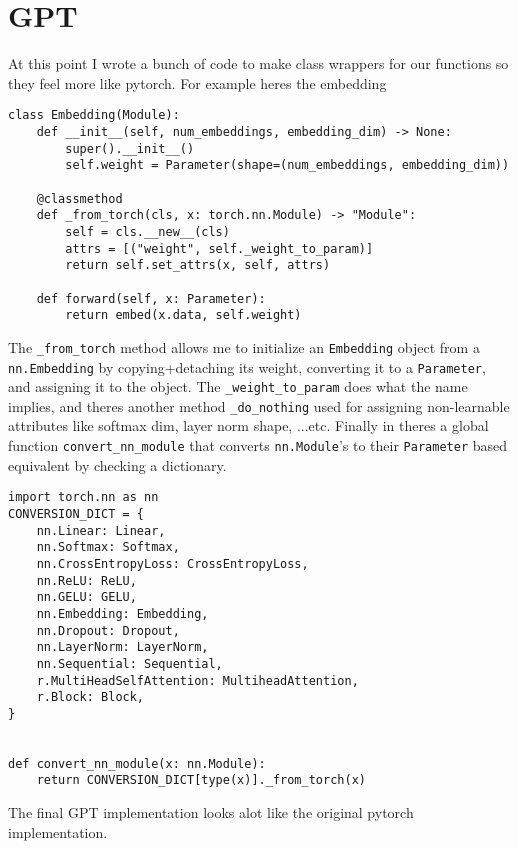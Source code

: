 \documentclass[11pt]{article}
\begin{document}
\section{GPT}
At this point I wrote a bunch of code to make class wrappers for our functions so they feel more like
pytorch. For example heres the embedding
\begin{verbatim}
class Embedding(Module):
    def __init__(self, num_embeddings, embedding_dim) -> None:
        super().__init__()
        self.weight = Parameter(shape=(num_embeddings, embedding_dim))

    @classmethod
    def _from_torch(cls, x: torch.nn.Module) -> "Module":
        self = cls.__new__(cls)
        attrs = [("weight", self._weight_to_param)]
        return self.set_attrs(x, self, attrs)

    def forward(self, x: Parameter):
        return embed(x.data, self.weight)
\end{verbatim}
The \texttt{\_from\_torch} method allows me to initialize an \texttt{Embedding} object from a \texttt{nn.Embedding}
by copying+detaching its weight, converting it to a \texttt{Parameter}, and assigning it to the object. The 
\texttt{\_weight\_to\_param} does what the name implies, and theres another method \texttt{\_do\_nothing} used for
assigning non-learnable attributes like softmax dim, layer norm shape, ...etc. Finally in theres a global function
\texttt{convert\_nn\_module} that converts \texttt{nn.Module}'s to their \texttt{Parameter} based equivalent by checking a 
dictionary. 
\begin{verbatim}
import torch.nn as nn
CONVERSION_DICT = {
    nn.Linear: Linear,
    nn.Softmax: Softmax,
    nn.CrossEntropyLoss: CrossEntropyLoss,
    nn.ReLU: ReLU,
    nn.GELU: GELU,
    nn.Embedding: Embedding,
    nn.Dropout: Dropout,
    nn.LayerNorm: LayerNorm,
    nn.Sequential: Sequential,
    r.MultiHeadSelfAttention: MultiheadAttention,
    r.Block: Block,
}


def convert_nn_module(x: nn.Module):
    return CONVERSION_DICT[type(x)]._from_torch(x)
\end{verbatim}
\par The final GPT implementation
looks alot like the original pytorch implementation.
\end{document}
